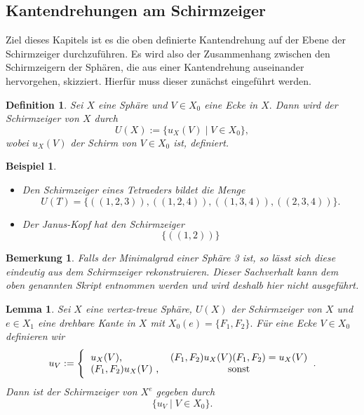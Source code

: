 \documentclass[12pt,titlepage,twoside,cleardoublepage]{article}
\theoremstyle{nummermitklammern}
\newtheorem{lemma}[temp]{Lemma}
\newtheorem{bsp}[temp]{Beispiel}
\newtheorem{definition}[temp]{Definition}
\newtheorem{bemerkung}[temp]{Bemerkung}
\newtheorem{definition}[zahl]{Definition}
\newtheorem{lemma}[zahl]{Lemma}
\newtheorem{bsp}[zahl]{Beispiel}
\newtheorem{bemerkung}[zahl]{Bemerkung}
\numberwithin{equation}{section}
\begin{document}
\subsection{Kantendrehungen am Schirmzeiger}
Ziel dieses Kapitels ist es die oben definierte Kantendrehung auf der Ebene der Schirmzeiger durchzuführen. Es wird also der Zusammenhang zwischen den Schirmzeigern der Sphären, die aus einer Kantendrehung auseinander hervorgehen, skizziert. Hierfür muss dieser zunächst eingeführt werden.

\begin{definition}
Sei $X$ eine Sphäre und $V\in X_0$ eine Ecke in $X.$ Dann wird der \emph{Schirmzeiger} von $X$ durch 
\[
U(X):=\{u_X(V) \mid V\in X_0\},
\]
wobei $u_X(V)$ der Schirm von $V\in X_0$ ist, definiert.
\end{definition}
\begin{bsp}
\begin{itemize}
\item 
Den Schirmzeiger eines Tetraeders bildet die Menge 
\[
U(T)=\{ ((1,2,3)),((1,2,4)),((1,3,4)),((2,3,4))\}.
\]
\item Der Janus-Kopf hat den Schirmzeiger 
\[
\{((1,2))\}
\]
\end{itemize}
\end{bsp}
\begin{bemerkung}
Falls der Minimalgrad einer Sphäre 3 ist, so lässt sich diese eindeutig aus dem Schirmzeiger rekonstruieren. Dieser Sachverhalt kann dem oben genannten Skript entnommen werden und wird deshalb hier nicht ausgeführt.
\end{bemerkung}
\begin{lemma}
Sei $X$ eine vertex-treue Sphäre, $U(X)$ der Schirmzeiger von $X$ und $e\in X_1$ eine drehbare Kante in $X$ mit $X_0(e)=\{F_1,F_2\}.$ Für eine Ecke $V\in X_0$ definieren wir  
\[
u_V:=
\Biggl\{
\begin{tabular}[l]{lcr}
\text{$u_X(V)$},&$(F_1,F_2)u_X(V)(F_1,F_2)=u_X(V)$ \\
$(F_1,F_2) u_X(V)$ ,& sonst \\

\end{tabular}.
\]
Dann ist der Schirmzeiger von $X^e$ gegeben durch 
\[
\{ u_V\mid V \in X_0\}.
\]
\end{lemma}
\end{document}
